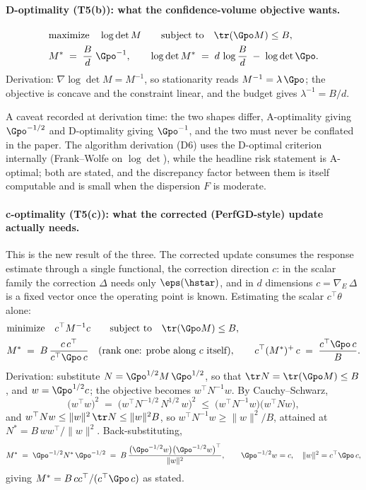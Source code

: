 \paragraph{D-optimality (T5(b)): what the confidence-volume objective
wants.}
\begin{align*}
& \text{maximize} \quad \log\det M
\qquad \text{subject to} \quad \tr(\Gpo M) \le B, \\
& M^{*} \;=\; \frac{B}{d}\;\Gpo^{-1},
\qquad
\log\det M^{*} \;=\; d\,\log\frac{B}{d} \;-\; \log\det \Gpo .
\end{align*}
Derivation: $\nabla \log\det M = M^{-1}$, so stationarity reads
$M^{-1} = \lambda\,\Gpo$; the objective is concave and the constraint
linear, and the budget gives $\lambda^{-1} = B/d$.

A caveat recorded at derivation time: the two shapes differ, A-optimality
giving $\Gpo^{-1/2}$ and D-optimality giving $\Gpo^{-1}$, and the two must
never be conflated in the paper. The algorithm derivation (D6) uses the
D-optimal criterion internally (Frank--Wolfe on $\log\det$), while the
headline risk statement is A-optimal; both are stated, and the discrepancy
factor between them is itself computable and is small when the dispersion
$F$ is moderate.

\paragraph{c-optimality (T5(c)): what the corrected (PerfGD-style) update
actually needs.}
This is the new result of the three. The corrected update consumes the
response estimate through a single functional, the correction direction
$c$: in the scalar family the correction $\Delta$ needs only
$\eps(\hstar)$, and in $d$ dimensions $c = \nabla_{E}\,\Delta$ is a fixed
vector once the operating point is known. Estimating the scalar
$c^\top\theta$ alone:
\begin{align*}
& \text{minimize} \quad c^\top M^{-1} c
\qquad \text{subject to} \quad \tr(\Gpo M) \le B, \\
& M^{*} \;=\; B\,\frac{c\,c^\top}{c^\top \Gpo\, c}
\quad \text{(rank one: probe along $c$ itself)},
\qquad
c^\top (M^{*})^{+}\, c \;=\; \frac{c^\top \Gpo\, c}{B}.
\end{align*}
Derivation: substitute $N = \Gpo^{1/2} M\, \Gpo^{1/2}$, so that
$\tr N = \tr(\Gpo M) \le B$, and $w = \Gpo^{1/2} c$; the objective becomes
$w^\top N^{-1} w$. By Cauchy--Schwarz,
\begin{equation*}
\big(w^\top w\big)^{2}
\;=\; \big(w^\top N^{-1/2}\, N^{1/2}\, w\big)^{2}
\;\le\; \big(w^\top N^{-1} w\big)\big(w^\top N w\big),
\end{equation*}
and $w^\top N w \le \|w\|^{2}\,\tr N \le \|w\|^{2} B$, so
$w^\top N^{-1} w \ge \|w\|^{2}/B$, attained at
$N^{*} = B\,ww^\top/\|w\|^{2}$. Back-substituting,
\begin{equation*}
M^{*} \;=\; \Gpo^{-1/2} N^{*}\, \Gpo^{-1/2}
\;=\; B\,\frac{\big(\Gpo^{-1/2} w\big)\big(\Gpo^{-1/2} w\big)^\top}
{\|w\|^{2}},
\qquad \Gpo^{-1/2} w = c,\quad \|w\|^{2} = c^\top\Gpo\,c,
\end{equation*}
giving $M^{*} = B\,cc^\top/(c^\top \Gpo\, c)$ as stated.

